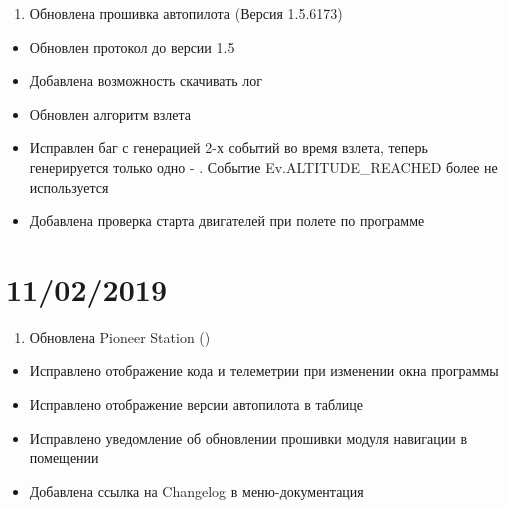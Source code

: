 \documentclass[a4paper,10pt,russian]{sphinxmanual}
\begin{document}
\begin{enumerate}
\def\theenumi{\arabic{enumi}}
\def\labelenumi{\theenumi .}
\makeatletter\def\p@enumii{\p@enumi \theenumi .}\makeatother
\setcounter{enumi}{1}
\item {} 
Обновлена прошивка автопилота (Версия 1.5.6173)

\end{enumerate}
\begin{itemize}
\item {} 
Обновлен протокол до версии 1.5

\item {} 
Добавлена возможность скачивать лог

\item {} 
Обновлен алгоритм взлета

\item {} 
Исправлен баг с генерацией 2-х событий во время взлета, теперь генерируется только одно - . Событие Ev.ALTITUDE\_REACHED более не используется

\item {} 
Добавлена проверка старта двигателей при полете по программе

\end{itemize}


\section{11/02/2019}
\label{\detokenize{changelog:id3}}\begin{enumerate}
\def\theenumi{\arabic{enumi}}
\def\labelenumi{\theenumi .}
\makeatletter\def\p@enumii{\p@enumi \theenumi .}\makeatother
\item {} 
Обновлена Pioneer Station ()

\end{enumerate}
\begin{itemize}
\item {} 
Исправлено отображение кода и телеметрии при изменении окна программы

\item {} 
Исправлено отображение версии автопилота в таблице

\item {} 
Исправлено уведомление об обновлении прошивки модуля навигации в помещении

\item {} 
Добавлена ссылка на Changelog в меню-документация

\end{itemize}
\end{document}
